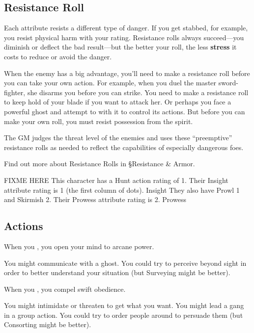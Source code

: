 \subsection{Resistance Roll}

Each attribute resists a different type of danger. If you get stabbed, for example, you resist physical harm with your  rating. Resistance rolls always succeed—you diminish or deflect the bad result—but the better your roll, the less \textbf{stress} it costs to reduce or avoid the danger.

When the enemy has a big advantage, you’ll need to make a resistance roll before you can take your own action. For example, when you duel the master sword-fighter, she disarms you before you can strike. You need to make a resistance roll to keep hold of your blade if you want to attack her. Or perhaps you face a powerful ghost and attempt to  with it to control its actions. But before you can make your own roll, you must resist possession from the spirit.

The GM judges the threat level of the enemies and uses these ``preemptive'' resistance rolls as needed to reflect the capabilities of especially dangerous foes.

Find out more about Resistance Rolls in  \S Resistance \& Armor.

FIXME HERE
This character has a Hunt action rating of 1.
Their Insight attribute rating is 1 (the first column of dots). Insight
They also have Prowl 1 and Skirmish 2.
Their Prowess attribute rating is 2. Prowess

\subsection{Actions}

When you , you open your mind to arcane power.

\begin{qb}You might communicate with a ghost. You could try to perceive beyond sight in order to better understand your situation (but Surveying might be better).\end{qb}

When you , you compel swift obedience.

\begin{qb}You might intimidate or threaten to get what you want. You might lead a gang in a group action. You could try to order people around to persuade them (but Consorting might be better).\end{qb}

